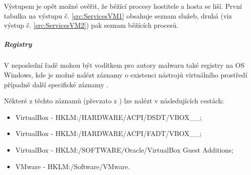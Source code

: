 Výstupem je opět možné ověřit, že běžící procesy hostitele a hosta se liší. První tabulka na výstupu č. \ref{src:ServicesVM1} obsahuje seznam služeb, druhá (viz výstup č. \ref{src:ServicesVM2}) pak seznam běžících procesů.

\noindent
\begin{minipage}[t]{.475\textwidth}
    
\end{minipage}
\hfill
\begin{minipage}[t]{.475\textwidth}
    
\end{minipage}

\subparagraph*{Registry}

V neposlední řadě mohou být vodítkem pro autory malwaru také registry na OS Windows, kde je možné nalézt záznamy o existenci nástrojů virtuálního prostředí případně další specifické záznamy \cite{cyberbit_2016}.


    Některé z těchto záznamů (převzato z \cite{github_antivmdetection}) lze nalézt v následujících cestách:
    
\begin{itemize}
 \setlength\itemsep{.0em}
  \item VirtualBox - HKLM:/HARDWARE/ACPI/DSDT/VBOX\_\_;
  \item VirtualBox - HKLM:/HARDWARE/ACPI/FADT/VBOX\_\_;
  \item VirtualBox - HKLM:/SOFTWARE/Oracle/VirtualBox Guest Additions;
  \item VMware - HKLM:/Software/VMware.
\end{itemize}
    